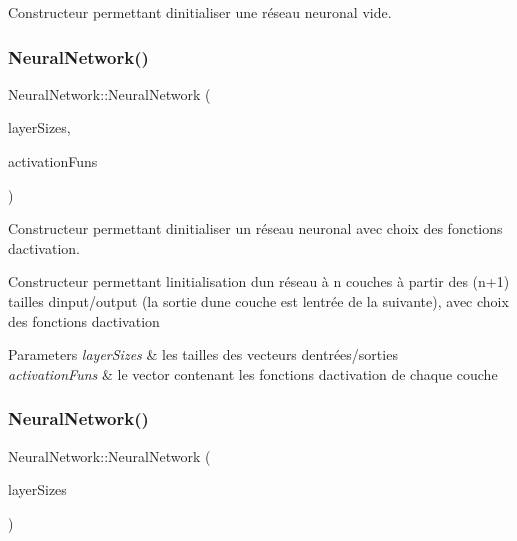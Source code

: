 Constructeur permettant d\textquotesingle{}initialiser une réseau neuronal vide. 

\mbox{\label{classNeuralNetwork_a85cd20f411e96dfd28954fcda39badb7}} 
\subsubsection{\texorpdfstring{Neural\+Network()}{NeuralNetwork()}\hspace{0.1cm}{\footnotesize\ttfamily [2/4]}}
{\footnotesize\ttfamily Neural\+Network\+::\+Neural\+Network (\begin{DoxyParamCaption}\item[{std\+::vector$<$ unsigned int $>$}]{layer\+Sizes,  }\item[{std\+::vector$<$ \hyperlink{structFunctions_ad25362ffa52b2f7933431190546593ac}{Functions\+::\+Activation\+Fun} $>$}]{activation\+Funs }\end{DoxyParamCaption})}



Constructeur permettant d\textquotesingle{}initialiser un réseau neuronal avec choix des fonctions d\textquotesingle{}activation. 

Constructeur permettant l\textquotesingle{}initialisation d\textquotesingle{}un réseau à n couches à partir des (n+1) tailles d\textquotesingle{}input/output (la sortie d\textquotesingle{}une couche est l\textquotesingle{}entrée de la suivante), avec choix des fonctions d\textquotesingle{}activation 
\begin{DoxyParams}{Parameters}
{\em layer\+Sizes} & les tailles des vecteurs d\textquotesingle{}entrées/sorties \\
\hline
{\em activation\+Funs} & le vector contenant les fonctions d\textquotesingle{}activation de chaque couche \\
\hline
\end{DoxyParams}
\mbox{\label{classNeuralNetwork_ab4015471a72a3d00b6bcabf156526f7b}} 
\subsubsection{\texorpdfstring{Neural\+Network()}{NeuralNetwork()}\hspace{0.1cm}{\footnotesize\ttfamily [3/4]}}
{\footnotesize\ttfamily Neural\+Network\+::\+Neural\+Network (\begin{DoxyParamCaption}\item[{std\+::vector$<$ unsigned int $>$}]{layer\+Sizes }\end{DoxyParamCaption})}



